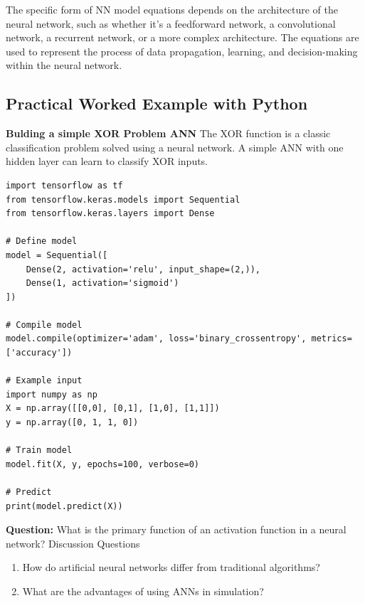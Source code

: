 \documentclass[12pt,a4paper]{article}
\begin{document}
The specific form of NN model equations depends on the architecture of the neural network, such as whether it's a feedforward network, a convolutional network, a recurrent network, or a more complex architecture. The equations are used to represent the process of data propagation, learning, and decision-making within the neural network.
\begin{example}
\subsection{Practical Worked Example with Python}
\textbf{Bulding a simple XOR Problem ANN}
The XOR function is a classic classification problem solved using a neural network. A simple ANN with one hidden layer can learn to classify XOR inputs.
\begin{verbatim}
import tensorflow as tf
from tensorflow.keras.models import Sequential
from tensorflow.keras.layers import Dense

# Define model
model = Sequential([
    Dense(2, activation='relu', input_shape=(2,)),
    Dense(1, activation='sigmoid')
])

# Compile model
model.compile(optimizer='adam', loss='binary_crossentropy', metrics=['accuracy'])

# Example input
import numpy as np
X = np.array([[0,0], [0,1], [1,0], [1,1]])
y = np.array([0, 1, 1, 0])

# Train model
model.fit(X, y, epochs=100, verbose=0)

# Predict
print(model.predict(X))
\end{verbatim}
\end{example}

\textbf{Question:} What is the primary function of an activation function in a neural network?
Discussion Questions
\begin{enumerate}
 \item How do artificial neural networks differ from traditional algorithms?
 \item What are the advantages of using ANNs in simulation?
\end{enumerate}
\end{document}

